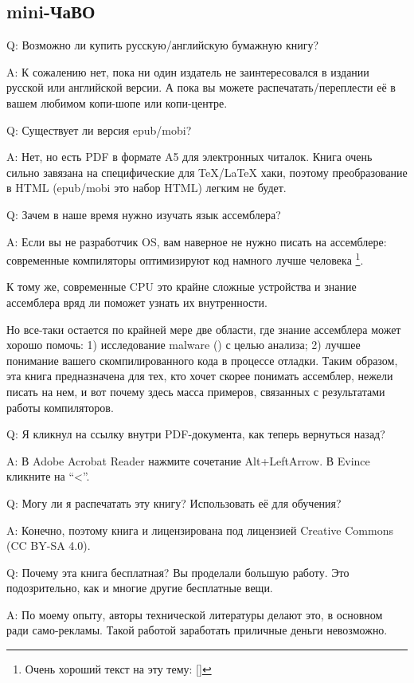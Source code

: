 \subsection*{mini-ЧаВО}

\par Q: Возможно ли купить русскую/английскую бумажную книгу?
\par A: К сожалению нет, пока ни один издатель не заинтересовался в издании русской или английской версии.
А пока вы можете распечатать/переплести её в вашем любимом копи-шопе или копи-центре.

\par Q: Существует ли версия epub/mobi?
\par A: Нет, но есть PDF в формате A5 для электронных читалок.
Книга очень сильно завязана на специфические для TeX/LaTeX хаки, поэтому преобразование в HTML (epub/mobi это набор HTML)
легким не будет.

\par Q: Зачем в наше время нужно изучать язык ассемблера?
\par A: Если вы не разработчик \ac{OS}, вам наверное не нужно писать на ассемблере: современные компиляторы оптимизируют код намного лучше человека
\footnote{Очень хороший текст на эту тему: [\AgnerFog]}.

К тому же, современные \ac{CPU} это крайне сложные устройства и знание ассемблера вряд ли
поможет узнать их внутренности.

Но все-таки остается по крайней мере две области, где знание ассемблера может хорошо помочь:
1) исследование malware () с целью анализа; 2) лучшее понимание
вашего скомпилированного кода в процессе отладки.
Таким образом, эта книга предназначена для тех, кто хочет скорее понимать ассемблер,
нежели писать на нем, и вот почему здесь масса примеров, связанных с результатами
работы компиляторов.

\par Q: Я кликнул на ссылку внутри PDF-документа, как теперь вернуться назад?
\par A: В Adobe Acrobat Reader нажмите сочетание Alt+LeftArrow. В Evince кликните на ``<''.

\par Q: Могу ли я распечатать эту книгу? Использовать её для обучения?
\par A: Конечно, поэтому книга и лицензирована под лицензией Creative Commons (CC BY-SA 4.0).

\par Q: Почему эта книга бесплатная? Вы проделали большую работу. Это подозрительно, как и многие другие бесплатные вещи.
\par A: По моему опыту, авторы технической литературы делают это, в основном ради само-рекламы. Такой работой заработать приличные деньги невозможно.

